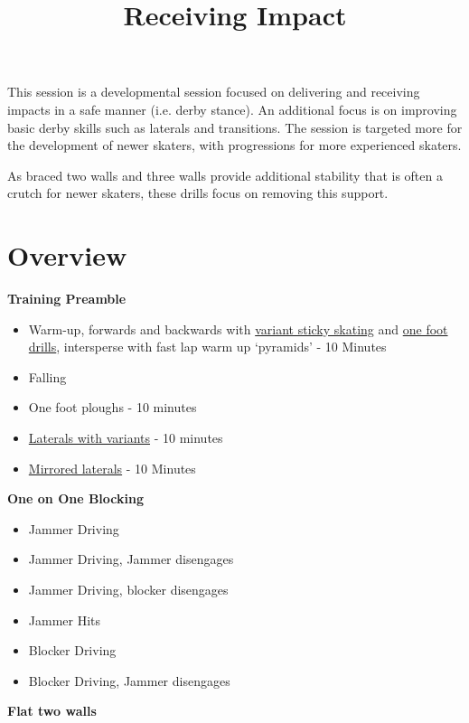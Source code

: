 \documentclass{journal}
\title{Receiving Impact}
\author{}
\begin{document}
\maketitle
\noindent 

This session is a developmental session focused on delivering and receiving impacts in a safe manner (i.e. derby stance).
An additional focus is on improving basic derby skills such as laterals and transitions. 
The session is targeted more for the development of newer skaters, with progressions for more experienced skaters.        


As braced two walls and three walls provide additional stability that is often a crutch for newer skaters, these drills focus on removing this support. 


\section*{Overview}

{\bf Training Preamble}
\begin{itemize}
\item Warm-up, forwards and backwards with \hyperref[drill:sticky:sticky_one_foot]{variant sticky skating} and \hyperref[drill:one_foot:serpentine]{one foot drills}, intersperse with fast lap warm up `pyramids' - 10 Minutes
\item Falling
\item One foot ploughs - 10 minutes
\item \hyperref[drill:laterals]{Laterals with variants} - 10 minutes 
\item \hyperref[drill:laterals:mirrored]{Mirrored laterals} - 10 Minutes 
\end{itemize}

\vspace{1cm}

{\bf One on One Blocking}
\begin{itemize}
\item Jammer Driving
\item Jammer Driving, Jammer disengages 
\item Jammer Driving, blocker disengages
\item Jammer Hits
\item Blocker Driving
\item Blocker Driving, Jammer disengages
\end{itemize}


\vspace{1cm}
\noindent 
{\bf Flat two walls}
\end{document}
